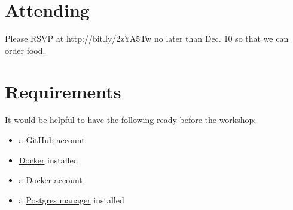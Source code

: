 \documentclass[letterpaper,11pt]{article}
\begin{document}
\section{Attending}
\noindent Please RSVP at http://bit.ly/2zYA5Tw no later than Dec. 10 so that we can
order food.

\section{Requirements} 

\noindent It would be helpful to have the following ready before the workshop: 
\begin{itemize}

\item a \href{https://github.com}{GitHub} account
\item \href {https://docs.docker.com/docker-for-mac/install/#download-docker-for-mac}{Docker} installed 
\item a \href {https://id.docker.com}{Docker account}
\item a \href{https://macpostgresclient.com/}{Postgres manager} installed

\end{itemize}






\newpage
\end{document}
